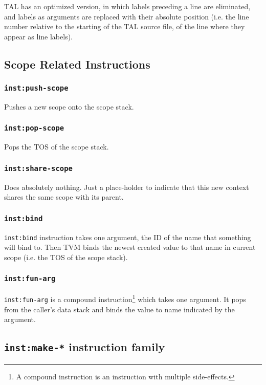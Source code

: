 \documentclass{article}
\newcommand{\inst}[1] {\texttt{inst:#1}}
\begin{document}
TAL has an optimized version, in which labels preceding a line are eliminated, and labels as arguments are replaced with their absolute position (i.e. the line number relative to the starting of the TAL source file, of the line where they appear as line labels).

\subsection{Scope Related Instructions}

\subsubsection{\inst{push-scope}}

Pushes a new scope onto the scope stack.

\subsubsection{\inst{pop-scope}}

Pops the TOS of the scope stack.

\subsubsection{\inst{share-scope}}

Does absolutely nothing. Just a place-holder to indicate that this new context shares the same scope with its parent.

\subsubsection{\inst{bind}}

\inst{bind} instruction takes one argument, the ID of the name that something will bind to. Then TVM binds the newest created value to that name in current scope (i.e. the TOS of the scope stack).

\subsubsection{\inst{fun-arg}}

\inst{fun-arg} is a compound instruction\footnote{A compound instruction is an instruction with multiple side-effects.} which takes one argument. It pops from the caller's data stack and binds the value to name indicated by the argument.

\subsection{\inst{make-*} instruction family}
\end{document}
